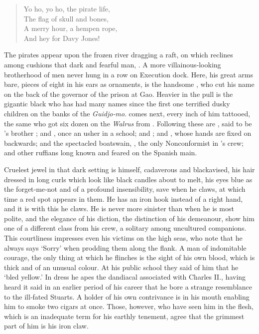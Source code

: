 \begin{drama}
{\begin{verse}
	Yo ho, yo ho, the pirate life,\\
	The flag of skull and bones,\\
	A merry hour, a hempen rope,\\
	And hey for Davy Jones!
\end{verse}

The pirates appear upon the frozen river dragging a raft,
on which reclines among cushions that dark and fearful man, .
A more villainous‐looking brotherhood of men never hung in a row on Execution dock.
Here, his great arms bare, pieces of eight in his ears as ornaments, is the handsome \cecco, who cut his name on the back of the governor of the prison at Gao.
Heavier in the pull is the gigantic black who has had many names since the first one terrified dusky children on the banks of the \emph{Guidjo‐mo}.
 comes next, every inch of him tattooed, the same \jukes who got six dozen on the \emph{Walrus} from .
Following these are \cookson, said to be ’s brother
;
and , once an usher in a school;
and  ;
and \noodler, whose hands are fixed on backwards;
and the spectacled boatswain, \smee, the only Nonconformist in \hook’s crew;
and other ruffians long known and feared on the Spanish main.

Cruelest jewel in that dark setting is \hook himself, cadaverous and blackavised,
his hair dressed in long curls which look like black candles about to melt,
his eyes blue as the forget‐me‐not and of a profound insensibility,
save when he claws, at which time a red spot appears in them.
He has an iron hook instead of a right hand, and it is with this he claws.
He is never more sinister than when he is most polite,
and the elegance of his diction, the distinction of his demeanour,
show him one of a different class from his crew, a solitary among uncultured companions.
This courtliness impresses even his victims on the high seas,
who note that he always says ‘Sorry’ when prodding them along the flank.
A man of indomitable courage,
the only thing at which he flinches is the sight of his own blood, which is thick and of an unusual colour.
At his public school they said of him that he ‘bled yellow.’
In dress he apes the dandiacal associated with Charles II.,
having heard it said in an earlier period of his career that he bore a strange resemblance to the ill‐fated Stuarts.
A holder of his own contrivance is in his mouth enabling him to smoke two cigars at once.
Those, however, who have seen him in the flesh, which is an inadequate term for his earthly tenement,
agree that the grimmest part of him is his iron claw.

}
\end{drama}
